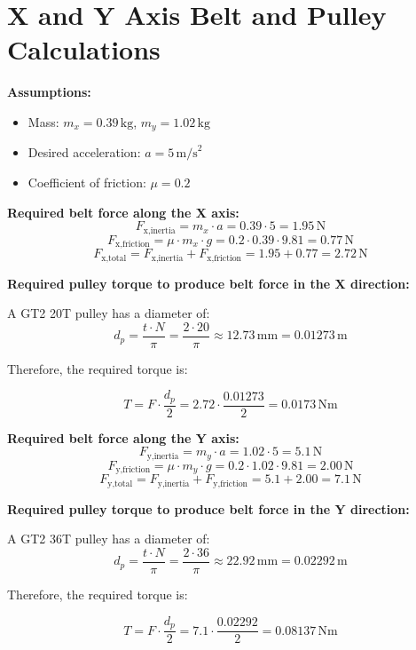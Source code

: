 \section{X and Y Axis Belt and Pulley Calculations}

\textbf{Assumptions:}
\begin{itemize}
  \item Mass: \( m_x = 0.39\,\text{kg} \), \( m_y = 1.02\,\text{kg}\)
  \item Desired acceleration: \( a = 5\,\text{m/s}^2 \)
  \item Coefficient of friction: \( \mu = 0.2 \)
\end{itemize}

\noindent\textbf{Required belt force along the X axis:}
\[ F_{\text{x,inertia}} = m_x \cdot a = 0.39 \cdot 5 = 1.95\,\text{N} \]
\[ F_{\text{x,friction}} = \mu \cdot m_x \cdot g = 0.2 \cdot 0.39\cdot 9.81 = 0.77\,\text{N} \]
\[
 F_{\text{x,total}} = F_{\text{x,inertia}} + F_{\text{x,friction}} = 1.95 + 0.77 = \boxed{2.72\,\text{N}}
\]

\noindent\textbf{Required pulley torque to produce belt force in the X direction:}

\noindent A GT2 20T pulley has a diameter of:
\[
  d_p = \frac{t \cdot N}{\pi} = \frac{2 \cdot 20}{\pi} \approx 12.73\,\text{mm} = 0.01273\,\text{m}
  \]

Therefore, the required torque is:

\[
T = F \cdot \frac{d_p}{2} = 2.72 \cdot \frac{0.01273}{2} = \boxed{0.0173\,\text{Nm}}
\]


\noindent\textbf{Required belt force along the Y axis:}
\[ F_{\text{y,inertia}} = m_y \cdot a = 1.02 \cdot 5 = 5.1\,\text{N} \]
\[ F_{\text{y,friction}} = \mu \cdot m_y \cdot g = 0.2 \cdot 1.02 \cdot 9.81 = 2.00\,\text{N} \]
\[
 F_{\text{y,total}} = F_{\text{y,inertia}} + F_{\text{y,friction}} = 5.1 + 2.00 = \boxed{7.1\,\text{N}}
\]


\noindent\textbf{Required pulley torque to produce belt force in the Y direction:}

\noindent A GT2 36T pulley has a diameter of:
\[
  d_p = \frac{t \cdot N}{\pi} = \frac{2 \cdot 36}{\pi} \approx 22.92\,\text{mm} = 0.02292\,\text{m}
\]

Therefore, the required torque is:

\[
T = F \cdot \frac{d_p}{2} = 7.1 \cdot \frac{0.02292}{2} = \boxed{0.08137\,\text{Nm}}
\]